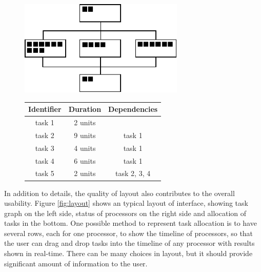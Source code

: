 \documentclass[a4paper,11pt]{article}
\begin{document}
\begin{figure}
\begin{minipage}{\textwidth}
    \hfill
    \begin{minipage}[b]{0.4\textwidth}
        \centering
        \includegraphics[width=0.7\textwidth]{repr.pdf}
        \vspace{0.5em}
        \label{fig:repr}
    \end{minipage}
    \hfill
    \begin{minipage}[b]{0.49\textwidth}
        \center
        \begin{tabular}{ccc}\hline
            Identifier & Duration & Dependencies \\ \hline
            task 1 & 2 units &  \\
            task 2 & 9 units & task 1 \\
            task 3 & 4 units & task 1 \\
            task 4 & 6 units & task 1\\
            task 5 & 2 units & task 2, 3, 4 \\ \hline
        \end{tabular}
        \label{tab:repr}
    \end{minipage}
    \hfill
\end{minipage}
\vspace{-1em}
\end{figure}

In addition to details, the quality of layout also contributes to the overall usability. Figure \ref{fig:layout} shows an typical layout of interface, showing task graph on the left side, status of processors on the right side and allocation of tasks in the bottom. One possible method to represent task allocation is to have several rows, each for one processor, to show the timeline of processors, so that the user can drag and drop tasks into the timeline of any processor with results shown in real-time. There can be many choices in layout, but it should provide significant amount of information to the user.
\end{document}

